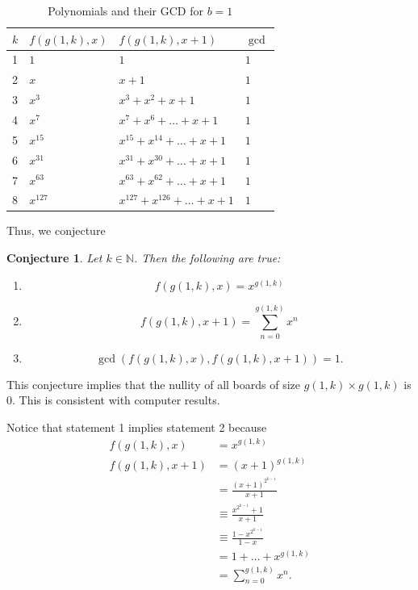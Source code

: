 \documentclass{article}
\newtheorem{conjecture}{Conjecture}
\newcommand{\N}{\mathbb{N}}
\begin{document}
	\begin{table}[H]
		\renewcommand{\arraystretch}{1.5}
		\centering
		\begin{tabular}{|l||l|l|l|}
			\hline
			$k$ & $f(g(1,k),x)$ & $f(g(1,k),x+1)$ & $\gcd$  \\
			\hline\hline
			1 & $1$ & $1$ & $1$ \\
			\hline
			2 & $x$ & $x+1$ & $1$ \\
			\hline
			3 & $x^3$ & $x^3+x^2+x+1$ & $1$ \\
			\hline
			4 & $x^7$ & $x^7 + x^6 + \dots + x + 1$ & $1$ \\
			\hline
			5 & $x^{15}$ & $x^{15} + x^{14} + \dots + x + 1$ & $1$ \\
			\hline
			6 & $x^{31}$ & $x^{31} + x^{30} + \dots + x + 1$ & $1$ \\
			\hline
			7 & $x^{63}$ & $x^{63} + x^{62} + \dots + x + 1$ & $1$ \\
			\hline
			8 & $x^{127}$ & $x^{127} + x^{126} + \dots + x + 1$ & $1$ \\
			\hline  
		\end{tabular}
		\caption{Polynomials and their GCD for $b=1$}
	\end{table}
	Thus, we conjecture
	\begin{conjecture}
		Let $k \in \N$.
		Then the following are true:
		\begin{enumerate}
			\item
			\begin{equation*}
				f(g(1,k),x) = x^{g(1,k)}
			\end{equation*}
			\item
			\begin{equation*}
				f(g(1,k),x+1) = \sum_{n=0}^{g(1,k)}{x^n}
			\end{equation*}
			\item
			\begin{equation*}
				\gcd\left({f(g(1,k),x), f(g(1,k),x+1)}\right) = 1.
			\end{equation*}
		\end{enumerate}
	\end{conjecture}
	This conjecture implies that the nullity of all boards of size $g(1,k) \times g(1,k)$ is $0$.
	This is consistent with computer results.
	
	Notice that statement 1 implies statement 2 because
	\begin{align*}
		f(g(1,k),x) &= x^{g(1,k)} \\
		f(g(1,k),x+1) &= (x+1)^{g(1,k)} \\
			&= \frac{(x+1)^{2^{k-1}}}{x+1} \\
			&\equiv \frac{x^{2^{k-1}}+1}{x+1} \\
			&\equiv \frac{1-x^{2^{k-1}}}{1-x} \\
			&= 1 + \dots + x^{g(1,k)} \\
			&= \sum_{n=0}^{g(1,k)}{x^n}.
	\end{align*}
	
\end{document}
